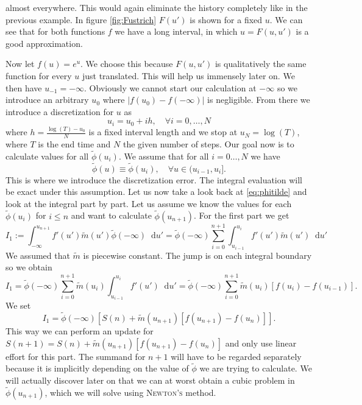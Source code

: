 \documentclass[12pt,a4paper,twoside, open=right]{scrreprt}
\theoremstyle{definition}
\theoremstyle{plain}
\newcommand{\abs}[1]{\left\vert #1\right\vert}
\newcommand{\D}{\mathop{}\!\mathrm{d}}
\begin{document}
almost everywhere. This would again eliminate the history completely like in the previous example. In figure \ref{fig:Fustrich} $F(u')$ is shown for a fixed $u$. We can see that for both functions $f$ we have a long interval, in which $u=F(u,u')$ is a good approximation. \par 
Now let $f(u)=e^u$. We choose this because $F(u,u')$ is qualitatively the same function for every $u$ just translated. This will help us immensely later on. We then have $u_{-1}=-\infty$. Obviously we cannot start our calculation at $-\infty$ so we introduce an arbitrary $u_0$ where $\abs{f(u_0)-f(-\infty)}$ is negligible. From there we introduce a discretization for $u$ as
\begin{equation}
    u_i = u_0+ih,\quad\forall i=0,\dotsc,N
\end{equation}
where $h = \frac{\log(T) -u_0}{N}$ is a fixed interval length and we stop at $u_N=\log(T)$, where $T$ is the end time and $N$ the given number of steps. Our goal now is to calculate values for all $\tilde\phi(u_i)$. We assume that for all $i=0\dotsc,N$ we have
\begin{equation}
    \tilde\phi(u) \equiv \tilde\phi(u_i), \quad\forall u\in(u_{i-1},u_i].
\end{equation}
This is where we introduce the discretization error. The integral evaluation will be exact under this assumption. Let us now take a look back at \eqref{eq:phitilde} and look at the integral part by part. Let us assume we know the values for each $\tilde\phi(u_i)$ for $i\le n$ and want to calculate $\tilde\phi(u_{n+1})$. For the first part we get
\begin{equation}
    I_1:=\int_{-\infty}^{u_{n+1}}f'(u')\tilde{m}(u')\tilde\phi(-\infty)\D u'=\tilde\phi(-\infty)\sum_{i=0}^{n+1}\int_{u_{i-1}}^{u_i}f'(u')\tilde{m}(u')\D u'
\end{equation}
We assumed that $\tilde{m}$ is piecewise constant. The jump is on each integral boundary so we obtain
\begin{equation}
    I_1 = \tilde{\phi}(-\infty)\sum_{i=0}^{n+1}\tilde{m}(u_i)\int_{u_{i-1}}^{u_i}f'(u')\D u' = \tilde{\phi}(-\infty)\sum_{i=0}^{n+1}\tilde{m}(u_i)[f(u_i)-f(u_{i-1})].
\end{equation}
We set 
\begin{equation}
    I_1 = \tilde\phi(-\infty)[S(n)+\tilde{m}(u_{n+1})[f(u_{n+1})-f(u_n)]].
\end{equation}
This way we can perform an update for $S(n+1) = S(n)+\tilde{m}(u_{n+1})[f(u_{n+1})-f(u_n)]$ and  only use linear effort for this part. The summand for $n+1$ will have to be regarded separately because it is implicitly depending on the value of $\tilde\phi$ we are trying to calculate. We will actually discover later on that we can at worst obtain a cubic problem in $\tilde\phi(u_{n+1})$, which we will solve using \textsc{Newton's} method.
\end{document}
